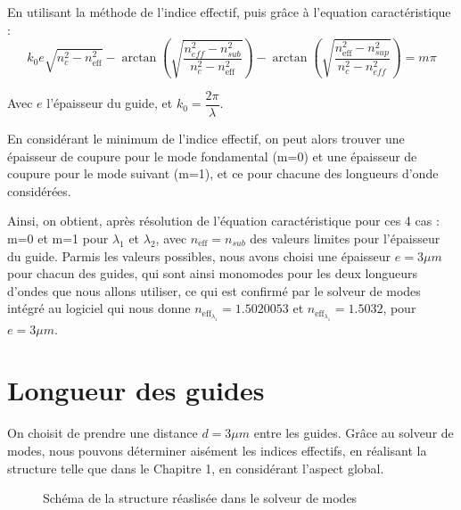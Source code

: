 \documentclass[a4paper,11pt]{report}
\begin{document}
En utilisant la méthode de l'indice effectif, puis grâce à l'equation caractéristique :
\begin{equation}
    k_0e\sqrt{n_c^2-n_{\text{eff}}^2}-\arctan\left(\sqrt{\dfrac{n_{eff}^2-n_{sub}^2}{n_{c}^2-n_{\text{eff}}^2}}\right)-\arctan\left(\sqrt{\dfrac{n_{\text{eff}}^2-n_{sup}^2}{n_{c}^2-n_{eff}^2}}\right)=m\pi
\end{equation}

Avec $e$ l'épaisseur du guide, et $k_0=\dfrac{2\pi}{\lambda}$.

En considérant le minimum de l'indice effectif, on peut alors trouver une épaisseur de coupure pour le mode fondamental (m=0) et une épaisseur de coupure pour le mode suivant (m=1), et ce pour chacune des longueurs d'onde considérées.

Ainsi, on obtient, après résolution de l'équation caractéristique pour ces 4 cas : m=0 et m=1 pour $\lambda_1$ et $\lambda_2$, avec $n_{\text{eff}}=n_{sub}$ des valeurs limites pour l'épaisseur du guide. Parmis les valeurs possibles, nous avons choisi une épaisseur $e=3\mu m$ pour chacun des guides, qui sont ainsi monomodes pour les deux longueurs d'ondes que nous allons utiliser, ce qui est confirmé par le solveur de modes intégré au logiciel qui nous donne $n_{\text{eff}_{\lambda_1}}=1.5020053$ et $n_{\text{eff}_{\lambda_1}}=1.5032$, pour $e=3\mu m$.

\section{Longueur des guides}
On choisit de prendre une distance $d=3\mu m$ entre les guides. Grâce au solveur de modes, nous pouvons déterminer aisément les indices effectifs, en réalisant la structure telle que dans le Chapitre 1, en considérant l'aspect global.

\begin{figure}[H]
\centering
{} 
\caption{Schéma de la structure réaslisée dans le solveur de modes}

\end{figure}
\end{document}
